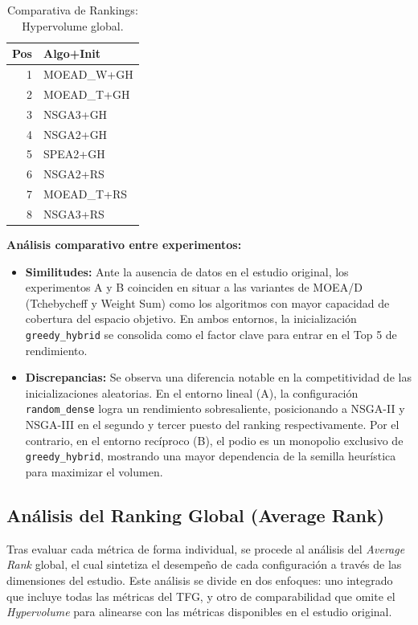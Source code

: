\documentclass[a4paper,10pt]{article}
\begin{document}
\begin{table}[H]
\begin{minipage}[t]{0.32\textwidth}
\begin{tabular}{rl}
            \toprule
            Pos & Algo+Init \\ \midrule
            1 & MOEAD\_W+GH \\
            2 & MOEAD\_T+GH \\
            3 & NSGA3+GH \\
            4 & NSGA2+GH \\
            5 & SPEA2+GH \\
            6 & NSGA2+RS \\
            7 & MOEAD\_T+RS \\
            8 & NSGA3+RS \\
            \bottomrule
        \end{tabular}
    \end{minipage}
    \caption{Comparativa de Rankings: Hypervolume global.}
\end{table}

\textbf{Análisis comparativo entre experimentos:}
\begin{itemize}
    \item \textbf{Similitudes:} Ante la ausencia de datos en el estudio original, los experimentos A y B coinciden en situar a las variantes de MOEA/D (Tchebycheff y Weight Sum) como los algoritmos con mayor capacidad de cobertura del espacio objetivo. En ambos entornos, la inicialización \texttt{greedy\_hybrid} se consolida como el factor clave para entrar en el Top 5 de rendimiento.
    \item \textbf{Discrepancias:} Se observa una diferencia notable en la competitividad de las inicializaciones aleatorias. En el entorno lineal (A), la configuración \texttt{random\_dense} logra un rendimiento sobresaliente, posicionando a NSGA-II y NSGA-III en el segundo y tercer puesto del ranking respectivamente. Por el contrario, en el entorno recíproco (B), el podio es un monopolio exclusivo de \texttt{greedy\_hybrid}, mostrando una mayor dependencia de la semilla heurística para maximizar el volumen.
\end{itemize}

\subsection{Análisis del Ranking Global (Average Rank)}

Tras evaluar cada métrica de forma individual, se procede al análisis del \textit{Average Rank} global, el cual sintetiza el desempeño de cada configuración a través de las dimensiones del estudio. Este análisis se divide en dos enfoques: uno integrado que incluye todas las métricas del TFG, y otro de comparabilidad que omite el \textit{Hypervolume} para alinearse con las métricas disponibles en el estudio original.
\end{document}
